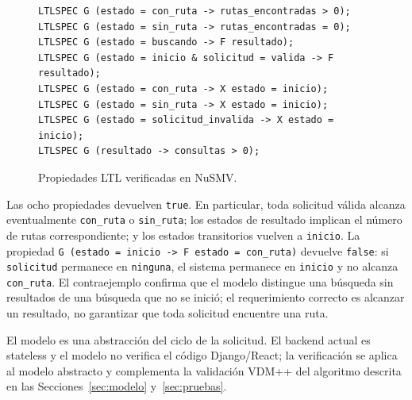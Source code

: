 \begin{figure}[!t]
\centering
\begin{lstlisting}
LTLSPEC G (estado = con_ruta -> rutas_encontradas > 0);
LTLSPEC G (estado = sin_ruta -> rutas_encontradas = 0);
LTLSPEC G (estado = buscando -> F resultado);
LTLSPEC G (estado = inicio & solicitud = valida -> F resultado);
LTLSPEC G (estado = con_ruta -> X estado = inicio);
LTLSPEC G (estado = sin_ruta -> X estado = inicio);
LTLSPEC G (estado = solicitud_invalida -> X estado = inicio);
LTLSPEC G (resultado -> consultas > 0);
\end{lstlisting}
\caption{Propiedades LTL verificadas en NuSMV.}
\label{fig:nusmv-propiedades}
\end{figure}

Las ocho propiedades devuelven \texttt{true}. En particular, toda solicitud válida alcanza eventualmente \texttt{con\_ruta} o \texttt{sin\_ruta}; los estados de resultado implican el número de rutas correspondiente; y los estados transitorios vuelven a \texttt{inicio}. La propiedad \texttt{G (estado = inicio -> F estado = con\_ruta)} devuelve \texttt{false}: si \texttt{solicitud} permanece en \texttt{ninguna}, el sistema permanece en \texttt{inicio} y no alcanza \texttt{con\_ruta}. El contraejemplo confirma que el modelo distingue una búsqueda sin resultados de una búsqueda que no se inició; el requerimiento correcto es alcanzar un resultado, no garantizar que toda solicitud encuentre una ruta.

El modelo es una abstracción del ciclo de la solicitud. El backend actual es stateless y el modelo no verifica el código Django/React; la verificación se aplica al modelo abstracto y complementa la validación VDM++ del algoritmo descrita en las Secciones~\ref{sec:modelo} y~\ref{sec:pruebas}.
